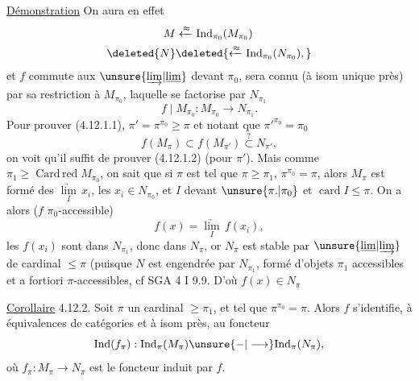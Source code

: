 \uline{Démonstration} \hspace{1em} On aura en effet
\[
\begin{aligned}
 M&\xleftarrow{\approx}\mathrm{Ind}_{\pi_0}(M_{\pi_0})\\
 \deleted{N}&\deleted{\xleftarrow{\approx}\mathrm{Ind}_{\pi_0}(N_{\pi_0}),}
\end{aligned}
\]
et $f$ commute aux $\unsure{\underrightarrow{\lim}|\underline{\lim}}$  devant
$\pi_0$, sera connu (à isom unique
près) par sa restriction à $M_{\pi_0}$, laquelle
se factorise par $N_{\pi_1}$
\[
 f\mid M_{\pi_0}: M_{\pi_0}\longrightarrow N_{\pi_1}.
\]
Pour prouver (4.12.1.1),  $\pi'=\pi^{\pi_0}\geq\pi$
et notant que ${\pi'}^{\pi_0}=\pi_0$
\[
 f(M_\pi)\subset f(M_{\pi'})\overset{?}{\subset}N_{\pi'},
\]
on voit qu'il suffit de prouver
(4.12.1.2) (pour $\pi'$).  Mais comme
$\pi_1\geq\operatorname{Card\,red}M_{\pi_0}$, on sait que si $\pi$ est
tel que $\pi\geq\pi_1$, $\pi^{\pi_0}=\pi$, alors $M_\pi$
est formé des $\underset I{\underrightarrow{\lim}}\,x_i$, les $x_i\in N_{\pi_0}$,
et $I$  devant $\unsure{\pi.|\pi_0}$ et $\operatorname{card} I\leq\pi$.
On a alors ($f$  $\pi_0$-accessible)
\[
 f(x)=\underset I{\underrightarrow{\lim}}\,f(x_i),
\]
les $f(x_i)$ sont dans $N_{\pi_1}$, donc dans $N_\pi$,
or $N_\pi$ est stable par $\unsure{\underline{\lim}|\underrightarrow{\lim}}$ de
cardinal $\leq\pi$ (puisque $N$ est engendrée
par $N_{\pi_1}$, formé d'objets $\pi_1$ accessibles
et a fortiori $\pi$-accessibles, cf
SGA 4 I 9.9. D'où $f(x)\in N_\pi$ 

\uline{Corollaire} 4.12.2.  Soit $\pi$ un cardinal $\geq\pi_1$,
et tel que $\pi^{\pi_0}=\pi$. Alors $f$ 
s'identifie, à équivalences de catégories
et à isom  près, au foncteur
\[
 \mathrm{Ind}(f_\pi):\mathrm{Ind}_\pi(M_\pi)\unsure{-|\longrightarrow}\mathrm{Ind}_\pi(N_\pi),
\]
où $f_\pi:M_\pi\longrightarrow N_\pi$ est le foncteur
induit par $f$.

